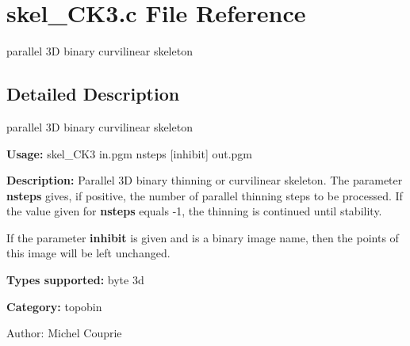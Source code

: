 \section{skel\_\-CK3.c File Reference}
\label{skel__CK3_8c}
parallel 3D binary curvilinear skeleton 



\subsection{Detailed Description}
parallel 3D binary curvilinear skeleton 

{\bf Usage:} skel\_\-CK3 in.pgm nsteps [inhibit] out.pgm

{\bf Description:} Parallel 3D binary thinning or curvilinear skeleton. The parameter {\bf nsteps} gives, if positive, the number of parallel thinning steps to be processed. If the value given for {\bf nsteps} equals -1, the thinning is continued until stability.

If the parameter {\bf inhibit} is given and is a binary image name, then the points of this image will be left unchanged.

{\bf Types supported:} byte 3d

{\bf Category:} topobin

\begin{Desc}
\item[Author:]Michel Couprie \end{Desc}

